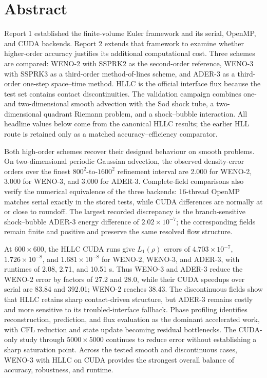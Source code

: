 \chapter*{Abstract}

Report 1 established the finite-volume Euler framework and its serial, OpenMP, and CUDA backends. Report 2 extends that framework to examine whether higher-order accuracy justifies its additional computational cost. Three schemes are compared: WENO-2 with SSPRK2 as the second-order reference, WENO-3 with SSPRK3 as a third-order method-of-lines scheme, and ADER-3 as a third-order one-step space--time method. HLLC is the official interface flux because the test set contains contact discontinuities. The validation campaign combines one- and two-dimensional smooth advection with the Sod shock tube, a two-dimensional quadrant Riemann problem, and a shock--bubble interaction. All headline values below come from the canonical HLLC results; the earlier HLL route is retained only as a matched accuracy--efficiency comparator.

Both high-order schemes recover their designed behaviour on smooth problems. On two-dimensional periodic Gaussian advection, the observed density-error orders over the finest \(800^2\)-to-\(1600^2\) refinement interval are 2.000 for WENO-2, 3.000 for WENO-3, and 3.000 for ADER-3. Complete-field comparisons also verify the numerical equivalence of the three backends: 16-thread OpenMP matches serial exactly in the stored tests, while CUDA differences are normally at or close to roundoff. The largest recorded discrepancy is the branch-sensitive shock--bubble ADER-3 energy difference of \(2.02\times10^{-7}\); the corresponding fields remain finite and positive and preserve the same resolved flow structure.

At \(600\times600\), the HLLC CUDA runs give \(L_1(\rho)\) errors of \(4.703\times10^{-7}\), \(1.726\times10^{-8}\), and \(1.681\times10^{-8}\) for WENO-2, WENO-3, and ADER-3, with runtimes of 2.08, 2.71, and 10.51 s. Thus WENO-3 and ADER-3 reduce the WENO-2 error by factors of 27.2 and 28.0, while their CUDA speedups over serial are 83.84 and 392.01; WENO-2 reaches 38.43. The discontinuous fields show that HLLC retains sharp contact-driven structure, but ADER-3 remains costly and more sensitive to its troubled-interface fallback. Phase profiling identifies reconstruction, prediction, and flux evaluation as the dominant accelerated work, with CFL reduction and state update becoming residual bottlenecks. The CUDA-only study through \(5000\times5000\) continues to reduce error without establishing a sharp saturation point. Across the tested smooth and discontinuous cases, WENO-3 with HLLC on CUDA provides the strongest overall balance of accuracy, robustness, and runtime.
